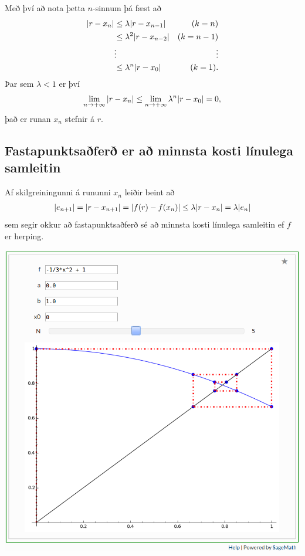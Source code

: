 \documentclass[A4paper,10pt,icelandic]{sphinxmanual}
\begin{document}
Með því að nota þetta \(n\)-sinnum þá fæst að
\begin{gather}
\begin{split}\begin{aligned}
    |r - x_n|   &\leq \lambda |r - x_{n-1}| & (k=n)\\
    &\leq \lambda^2 |r - x_{n-2}| & (k=n-1)\\
    &\vdots & \vdots\\
    &\leq \lambda^n |r - x_0| & (k=1).
\end{aligned}\end{split}\notag
\end{gather}
Þar sem \(\lambda < 1\) er því
\begin{gather}
\begin{split}\lim\limits_{n \to +\infty} |r - x_n|
\leq \lim\limits_{n \to +\infty} \lambda^n |r - x_0|
= 0,\end{split}\notag
\end{gather}
það er runan \(x_n\) stefnir á \(r\).


\subsection{Fastapunktsaðferð er að minnsta kosti línulega samleitin}
\label{kafli02:fastapunktsafer-er-a-minnsta-kosti-linulega-samleitin}
Af skilgreiningunni á rununni \(x_n\) leiðir beint að
\begin{gather}
\begin{split}|e_{n+1}|=|r-x_{n+1}|=|f(r)-f(x_n)|\leq \lambda|r-x_n|=\lambda|e_n|\end{split}\notag
\end{gather}
sem segir okkur að fastapunktsaðferð sé að minnsta kosti línulega
samleitin ef \(f\) er herping.


\begin{center}
\includegraphics[width=8 cm,keepaspectratio=true]{fixedpoint.png}

\end{center}
\end{document}
